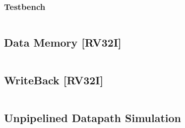 \subsubsection{Testbench}
\begin{code}
\label{code:IE_TB}  
\inputminted[fontsize=\footnotesize]{vhdl}{\simfolder IE_testbench.vhd}
\end{code}
\newpage


\subsection{Data Memory [RV32I]}
\begin{code}
\label{code:DM_code}  
\inputminted[fontsize=\footnotesize]{vhdl}{\srcfolder data_memory.vhd}
\end{code}
\newpage


\subsection{WriteBack [RV32I]}
\begin{code}
\label{code:WB_code}  
\inputminted[fontsize=\footnotesize]{vhdl}{\srcfolder write_back.vhd}
\end{code}

\subsection{Unpipelined Datapath Simulation}
\begin{code}
\label{code:DP_test}  
\inputminted[fontsize=\footnotesize]{vhdl}{\simfolder WB_testbench.vhd}
\end{code}
\newpage
